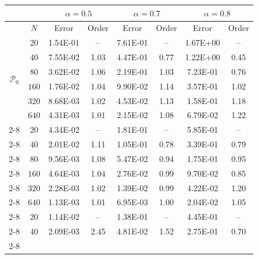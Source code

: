 \documentclass[11pt]{article}
\numberwithin{equation}{section}
\begin{document}
\begin{table}[!ht]\centering

\begin{tabular}{|c|c|cc|cc|cc|}
  \hline
  & & \multicolumn{2}{c}{$\alpha=0.5$}&\multicolumn{2}{|c}{$\alpha=0.7$}&\multicolumn{2}{|c|}{$\alpha=0.8$}\\ \hline
  & $N$ & Error & Order & Error  & Order& Error &Order\\ \hline
  \multirow{6}{0.6cm}{$\mathcal{P}_0$}& $   20$ &    1.54E-01&     --    &    7.61E-01&     --     &    1.67E+00&     --    \\ \cline{2-8}
& $   40$ &    7.55E-02&     1.03  &    4.47E-01&     0.77	 &    1.22E+00&     0.45  \\ \cline{2-8}
& $   80$ &    3.62E-02&     1.06  &    2.19E-01&     1.03	 &    7.23E-01&     0.76  \\ \cline{2-8}
& $  160$ &    1.76E-02&     1.04  &    9.90E-02&     1.14	 &    3.57E-01&     1.02  \\ \cline{2-8}
& $  320$ &    8.68E-03&     1.02  &    4.53E-02&     1.13	 &    1.58E-01&     1.18  \\ \cline{2-8}
& $  640$ &    4.31E-03&     1.01  &    2.15E-02&     1.08	 &    6.79E-02&     1.22  \\ \cline{2-8}
  \hline
\multirow{6}{0.6cm}{$\mathcal{P}_1$}& $   20$ &    4.34E-02&     --    &    1.81E-01&     --     &    5.85E-01&     --    \\ \cline{2-8}
& $   40$ &    2.01E-02&     1.11  &    1.05E-01&     0.78	 &    3.39E-01&     0.79  \\ \cline{2-8}
& $   80$ &    9.56E-03&     1.08  &    5.47E-02&     0.94	 &    1.75E-01&     0.95  \\ \cline{2-8}
& $  160$ &    4.64E-03&     1.04  &    2.76E-02&     0.99	 &    9.70E-02&     0.85  \\ \cline{2-8}
& $  320$ &    2.28E-03&     1.02  &    1.39E-02&     0.99	 &    4.22E-02&     1.20  \\ \cline{2-8}
& $  640$ &    1.13E-03&     1.01  &    6.95E-03&     1.00	 &    2.04E-02&     1.05  \\ \cline{2-8}
  \hline
\multirow{6}{0.6cm}{$\mathcal{P}_2$}& $   20$ &    1.14E-02&     --    &    1.38E-01&      --    &    4.45E-01&      --    \\ \cline{2-8}
& $   40$ &    2.09E-03&     2.45  &    4.81E-02&     1.52	 &    2.75E-01&     0.70   \\ \cline{2-8}

\end{tabular}
\end{table}
\end{document}
